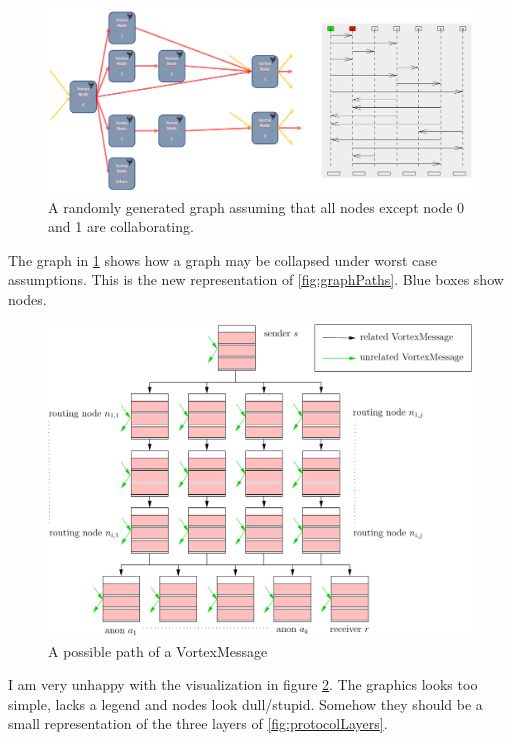 \documentclass[11pt]{extarticle}
\begin{document}
	\begin{figure}[H]\centering
		\includegraphics[width=1\textwidth]{inc/reducedMessageGraphPaths}
		\caption{A randomly generated graph assuming that all nodes except node 0 and 1 are collaborating.}
		\label{fig:reducedMessageGraphPaths}
	\end{figure}
	The graph in \cref{fig:reducedMessageGraphPaths} shows how a graph may be collapsed under worst case assumptions. This is the new representation of \cref{fig:graphPaths}. Blue boxes show nodes.
	

	\begin{figure}[!h]
		\centering\includegraphics[width=0.7\columnwidth]{inc/messagePaths}
		\caption{A possible path of a VortexMessage}
		\label{fig:messagePaths}
	\end{figure}
    I am very unhappy with the visualization in figure \cref{fig:messagePaths}. The graphics looks too simple, lacks a legend and nodes look dull/stupid. Somehow they should be a small representation of the three layers of \cref{fig:protocolLayers}.
	
\end{document}
